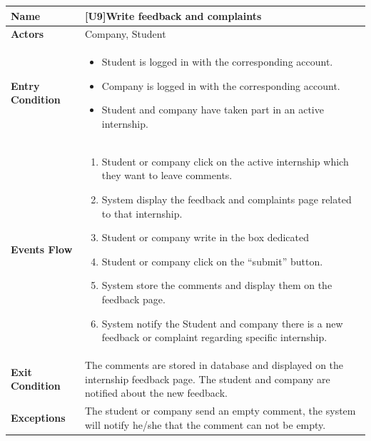 \begin{center}
    \begin{tabular}{|p{9em}|p{27em}|}
        \hline
        \rowcolor{bluepoli!40} %
        \textbf{Name} & \textbf{[U9]Write feedback and complaints} \\
        \hline
        \textbf{Actors} & Company, Student\\
        \hline
        \textbf{Entry Condition} & 
        \begin{itemize}
            \item Student is logged in with the corresponding account.
            \item Company is logged in with the corresponding account.
            \item Student and company have taken part in an active internship.
        \end{itemize} \\
        \hline
        \textbf{Events Flow} & 
        \begin{enumerate}
            \item Student or company click on the active internship which they want to leave comments.
            \item System display the feedback and complaints page related to that internship.
            \item Student or company write in the box dedicated
            \item Student or company click on the ``submit'' button.
            \item System store the comments and display them on the feedback page.
            \item System notify the Student and company there is a new feedback or complaint regarding specific internship.
        \end{enumerate} \\
        \hline
        \textbf{Exit Condition} & 
         The comments are stored in database and displayed on the internship feedback page. The student and company are notified about the new feedback.\\
        \hline
        \textbf{Exceptions} &
        The student or company send an empty comment, the system will notify he/she that the comment can not be empty.\\
        \hline
    \end{tabular}
\end{center}

